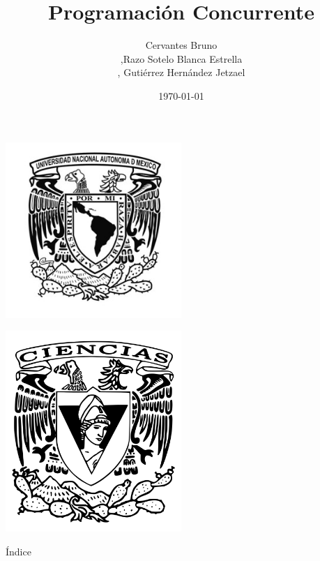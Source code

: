\documentclass{beamer}
\title[\insertframenumber/\inserttotalframenumber]{ \bf Programación Concurrente }
\author{Cervantes Bruno\\ ,Razo Sotelo Blanca Estrella\\, Gutiérrez Hernández Jetzael\\}
\institute{Facultad de Ciencias, UNAM}
\date{\today}
\begin{document}
\begin{frame}[plain] 
\titlepage
\begin{center}
\begin{minipage}{0.45\textwidth}
    \includegraphics[width=0.5\textwidth, keepaspectratio]{logo_unam.jpg}
\end{minipage}
\hspace{0.05\textwidth}
\begin{minipage}{0.45\textwidth}
    \includegraphics[width=0.5\textwidth, keepaspectratio]{escudo_fciencias.png}
\end{minipage}
\end{center}
\end{frame}


\begin{frame}{Índice}
  \tableofcontents
\end{frame}
\end{document}
